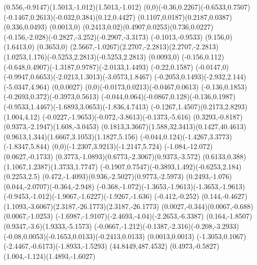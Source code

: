 {    \rcurveto(0.556,-0.9147)(1.5013,-1.012)(1.5013,-1.012)
    \rcurveto(0,0)(-0.36,0.2267)(-0.6533,0.7507)
    \rcurveto(-0.1467,0.2613)(-0.032,0.384)(0.12,0.4427)
    \rcurveto(0.1107,0.0187)(0.2187,0.0387)(0.336,0.0493)
    \rlineto(0.0013,0)
    \rcurveto(0.2413,0.02)(0.4907,0.0253)(0.736,0.0227)
    \rcurveto(-0.156,-2.028)(-0.2827,-3.252)(-0.2907,-3.3173)
    \rlineto(-0.1013,-0.9533)
    \rlineto(9.156,0)
    \rlineto(1.6413,0)
    \rlineto(0.3653,0)
    \rcurveto(2.5667,-1.0267)(2.2707,-2.2813)(2.2707,-2.2813)
    \rcurveto(1.0253,1.176)(-0.5253,2.2813)(-0.5253,2.2813)
    \rlineto(0.0093,0)
    \rlineto(-0.156,0.112)
    \rcurveto(-0.648,0.4907)(-1.3187,0.9787)(-2.0133,1.4493)
    \rlineto(-0.22,0.1587)
    \rlineto(-0.0147,0)
    \rcurveto(-0.9947,0.6653)(-2.0213,1.3013)(-3.0573,1.8467)
    \rcurveto(-0.2053,0.1493)(-2.932,2.144)(-5.0347,4.964)
    \rlineto(0,0.0027)
    \rcurveto(0,0)(-0.0173,0.0213)(-0.0467,0.0613)
    \rcurveto(-0.136,0.1853)(-0.2693,0.372)(-0.3973,0.5613)
    \rcurveto(-0.044,0.064)(-0.0867,0.128)(-0.136,0.1987)
    \rcurveto(-0.9533,1.4467)(-1.6893,3.0653)(-1.836,4.7413)
    \rcurveto(-0.1267,1.4507)(0.2173,2.8293)(1.004,4.12)
    \rcurveto(-0.0227,-1.9653)(-0.072,-3.8613)(-0.1373,-5.616)
    \rcurveto(0.3293,-0.8187)(0.9373,-2.1947)(1.608,-3.0453)
    \rcurveto(0.1813,3.3667)(1.588,32.3413)(0.1427,40.4613)
    \rcurveto(0.9613,1.344)(1.6667,3.1053)(1.1827,5.156)
    \rcurveto(-0.044,0.124)(-1.4267,3.3773)(-1.8347,5.844)
    \rcurveto(0,0)(-1.2307,3.9213)(-1.2147,5.724)
    \rlineto(-1.084,-12.072)
    \rlineto(0.0627,-0.1733)
    \rcurveto(0.3773,-1.0893)(0.6773,-2.3067)(0.9373,-3.572)
    \rcurveto(0.6133,0.388)(1.1067,1.2387)(1.3733,1.7747)
    \rcurveto(-0.1907,0.7547)(-0.3893,1.492)(-0.6253,2.184)
    \rlineto(0.2253,2.5)
    \rcurveto(0.472,-1.4093)(0.936,-2.5027)(0.9773,-2.5973)
    \rcurveto(0.2493,-1.076)(0.044,-2.0707)(-0.364,-2.948)
    \rcurveto(-0.368,-1.072)(-1.3653,-1.9613)(-1.3653,-1.9613)
    \rcurveto(-0.9453,-1.012)(-1.9067,-1.6227)(-1.9267,-1.636)
    \rlineto(-0.412,-0.252)
    \rlineto(0.144,-0.4627)
    \rcurveto(1.1093,-3.6067)(2.3187,-26.1773)(2.3187,-26.1773)
    \rcurveto(0.0027,-0.344)(0.0067,-0.688)(0.0067,-1.0253)
    \rcurveto(-1.6987,-1.9107)(-2.4693,-4.04)(-2.2653,-6.3387)
    \rcurveto(0.164,-1.8507)(0.9347,-3.6)(1.9333,-5.1573)
    \rcurveto(-0.0667,-1.212)(-0.1387,-2.316)(-0.208,-3.2933)
    \rcurveto(-0.08,0.0053)(-0.1653,0.0133)(-0.2413,0.0133)
    \rlineto(0.0013,0.0013)
    \rcurveto(-1.3053,0.1067)(-2.4467,-0.6173)(-1.8933,-1.5293)
    \moveto(44.8449,487.4532)
    \rcurveto(0.4973,-0.5827)(1.004,-1.124)(1.4893,-1.6027)
}
